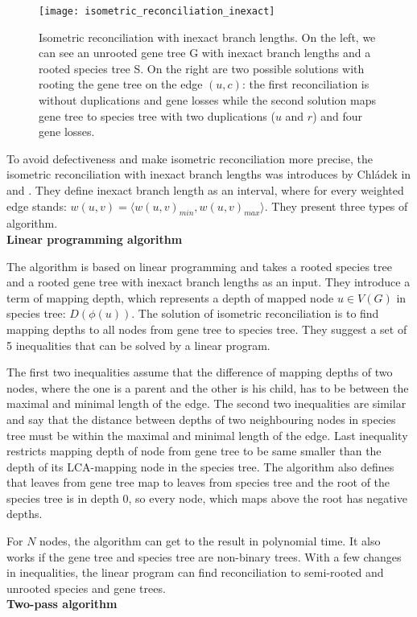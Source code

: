 \begin{figure}[ht]
	\centering
	\label{isometric_reconciliation_inexact}
  	\texttt{[image: isometric\_reconciliation\_inexact]}
  	\caption[Isometric reconciliation with inexact branch lengths]{Isometric reconciliation with inexact branch lengths. On the left, we can see an unrooted gene tree G with inexact branch lengths and a rooted species tree S. On the right are two possible solutions with rooting the gene tree on the edge $(u, c)$: the first reconciliation is without duplications and gene losses while the second solution maps gene tree to species tree with two duplications ($u$ and $r$) and four gene losses.}
\end{figure}

To avoid defectiveness and make isometric reconciliation more precise, the isometric reconciliation with inexact branch lengths was introduces by Chládek in \cite{chladek_unpublished} and \cite{chladek_thesis}. They define inexact branch length as an interval, where for every weighted edge stands: $w(u, v) = \langle w(u, v)_{min}, w(u, v)_{max} \rangle$. They present three types of algorithm.\\
\textbf{Linear programming algorithm}

The algorithm is based on linear programming and takes a rooted species tree and a rooted gene tree with inexact branch lengths as an input. They introduce a term of mapping depth, which represents a depth of mapped node $u \in V(G)$ in species tree: $D(\phi(u))$. The solution of isometric reconciliation is to find mapping depths to all nodes from gene tree to species tree. They suggest a set of 5 inequalities that can be solved by a linear program.

The first two inequalities assume that the difference of mapping depths of two nodes, where the one is a parent and the other is his child, has to be between the maximal and minimal length of the edge. The second two inequalities are similar and say that the distance between depths of two neighbouring nodes in species tree must be within the maximal and minimal length of the edge. Last inequality restricts mapping depth of node from gene tree to be same smaller than the depth of its LCA-mapping node in the species tree. The algorithm also defines that leaves from gene tree map to leaves from species tree and the root of the species tree is in depth 0, so every node, which maps above the root has negative depths. 

For $N$ nodes, the algorithm can get to the result in polynomial time. It also works if the gene tree and species tree are non-binary trees. With a few changes in inequalities, the linear program can find reconciliation to semi-rooted and unrooted species and gene trees.\\
\textbf{Two-pass algorithm} \label{two-pass_algorithm}

